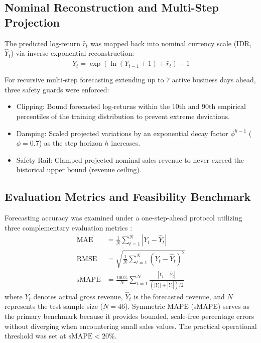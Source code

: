 \documentclass[10pt,a4paper]{article}
\begin{document}
\subsection{Nominal Reconstruction and Multi-Step Projection}
The predicted log-return $\hat{r}_t$ was mapped back into nominal currency scale (IDR, $\hat{Y}_t$) via inverse exponential reconstruction:
\begin{equation}
  \hat{Y}_t = \exp\left(\ln(Y_{t-1} + 1) + \hat{r}_t\right) - 1
  \label{eq:rekonstruksi}
\end{equation}

For recursive multi-step forecasting extending up to 7 active business days ahead, three safety guards were enforced:
\begin{itemize}
  \item Clipping: Bound forecasted log-returns within the 10th and 90th empirical percentiles of the training distribution to prevent extreme deviations.
  \item Damping: Scaled projected variations by an exponential decay factor $\phi^{h-1}$ ($\phi = 0.7$) as the step horizon $h$ increases.
  \item Safety Rail: Clamped projected nominal sales revenue to never exceed the historical upper bound (revenue ceiling).
\end{itemize}

\subsection{Evaluation Metrics and Feasibility Benchmark}
Forecasting accuracy was examined under a one-step-ahead protocol utilizing three complementary evaluation metrics \cite{hyndman2006, hodson2022}:
\begin{align}
  \text{MAE} &= \frac{1}{N} \sum_{t=1}^N \left| Y_t - \hat{Y}_t \right| \label{eq:mae} \\
  \text{RMSE} &= \sqrt{\frac{1}{N} \sum_{t=1}^N \left( Y_t - \hat{Y}_t \right)^2} \label{eq:rmse} \\
  \text{sMAPE} &= \frac{100\%}{N} \sum_{t=1}^N \frac{\left| Y_t - \hat{Y}_t \right|}{\left( \left| Y_t \right| + \left| \hat{Y}_t \right| \right) / 2} \label{eq:smape}
\end{align}
where $Y_t$ denotes actual gross revenue, $\hat{Y}_t$ is the forecasted revenue, and $N$ represents the test sample size ($N=46$). Symmetric MAPE (sMAPE) serves as the primary benchmark because it provides bounded, scale-free percentage errors without diverging when encountering small sales values. The practical operational threshold was set at $\text{sMAPE} < 20\%$.
\end{document}
